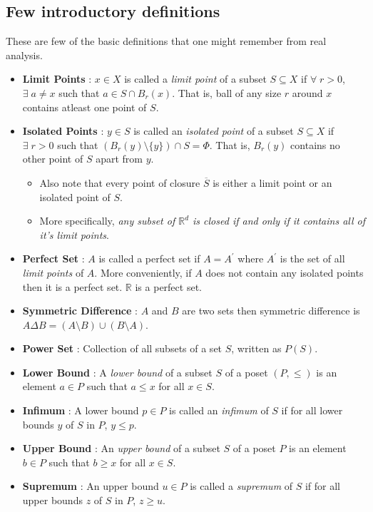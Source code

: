 \documentclass{article}
\theoremstyle{definition}
\theoremstyle{remark}
\theoremstyle{definition}
\theoremstyle{definition}
\theoremstyle{definition}
\newcommand{\intrs}{\cap}
\newcommand{\closure}[1]{\overline{#1}}
\newcommand{\R}{\mathbb{R}}
\begin{document}
\subsection{Few introductory definitions}
These are few of the basic definitions that one might remember from real analysis.
\begin{itemize}
	\item{\textbf{Limit Points} : $ x\in X $ is called a \emph{limit point} of a subset $ S \subseteq X $ if $\forall\; r > 0 $, $ \exists\; a\neq x$ such that $ a\in S\intrs B_{r}(x) $. That is, ball of any size $ r $ around $ x $ contains atleast one point of $ S $.}
	\item{\textbf{Isolated Points} : $ y\in S $ is called an \emph{isolated point} of a subset $ S\subseteq X $ if $ \exists \;r > 0 $ such that $ (B_r(y)\setminus \{y\}) \intrs S = \Phi $. That is, $ B_r(y) $ contains no other point of $ S $ apart from $ y $. \begin{itemize}
			\item {Also note that every point of closure $ \closure{S} $ is either a limit point or an isolated point of $ S $.}
			\item {More specifically, \emph{any subset of $ \R^d $ is closed if and only if it contains all of it's limit points}.}
		\end{itemize} }
	\item{\textbf{Perfect Set} : $ A $ is called a perfect set if $ A = A^\prime $ where $ A^\prime $ is the set of all \emph{limit points} of $ A $. More conveniently, if $ A $ does not contain any isolated points then it is a perfect set. $ \R $ is a perfect set.}
	\item {\textbf{Symmetric Difference} : $ A $ and $ B $ are two sets then symmetric difference is $ A\Delta B = (A\setminus B) \cup (B\setminus A)$.}
	\item {\textbf{Power Set} : Collection of all subsets of a set $ S $, written as $ P(S) $.}
	\item {\textbf{Lower Bound} : 	A \emph{lower bound} of a subset $ S $ of a poset $ (P,\le) $ is an element $ a \in P$ such that $ a\le x $ for all $ x\in S $.}
	\item {\textbf{Infimum} : A lower bound $ p\in P $ is called an \emph{infimum} of $ S $ if for all lower bounds $ y $ of $ S $ in $ P $, $ y\le p $.}
	\item {\textbf{Upper Bound} : An \emph{upper bound} of a subset $ S $ of a poset $  P$ is an element $ b\in P $ such that $ b\ge x $ for all $ x\in S $.}
	\item {\textbf{Supremum} : An upper bound $ u\in P $ is called a \emph{supremum} of $ S $ if for all upper bounds $ z $ of $ S $ in $ P $, $ z \ge u $.}

\end{itemize}
\end{document}
